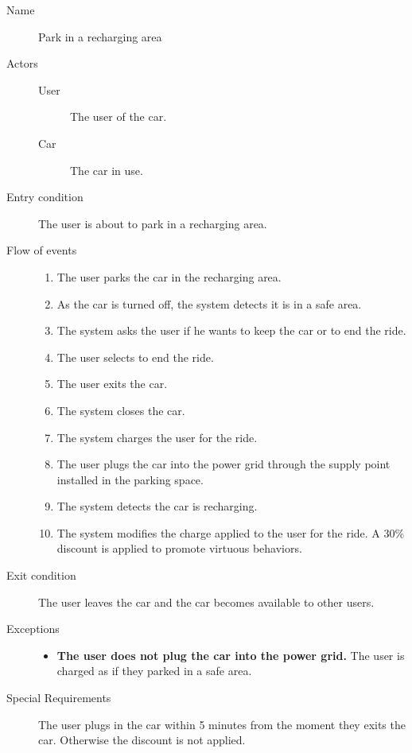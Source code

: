 		\begin{description}
			\item[Name] Park in a recharging area
			\item[Actors] \hfill
			\begin{description}
				\item[User] The user of the car.
				\item[Car] The car in use.
			\end{description}
			\item[Entry condition] The user is about to park in a recharging area.
			\item[Flow of events] \hfill
			\begin{enumerate}
				\item The user parks the car in the recharging area.
				\item As the car is turned off, the system detects it is in a safe area.
				\item The system asks the user if he wants to keep the car or to end the ride.
				\item The user selects to end the ride.
				\item The user exits the car.
				\item The system closes the car.
				\item The system charges the user for the ride.
				\item The user plugs the car into the power grid through the supply point installed in the parking space.
				\item The system detects the car is recharging.
				\item The system modifies the charge applied to the user for the ride. A 30\% discount is applied to promote virtuous behaviors.
			\end{enumerate}
			\item[Exit condition] The user leaves the car and the car becomes available to other users.
			\item[Exceptions] \hfill
			\begin{itemize}
				\item \textbf{The user does not plug the car into the power grid.} The user is charged as if they parked in a safe area.
			\end{itemize}
			\item[Special Requirements] The user plugs in the car within 5 minutes from the moment they exits the car. Otherwise the discount is not applied.
		\end{description}
		
